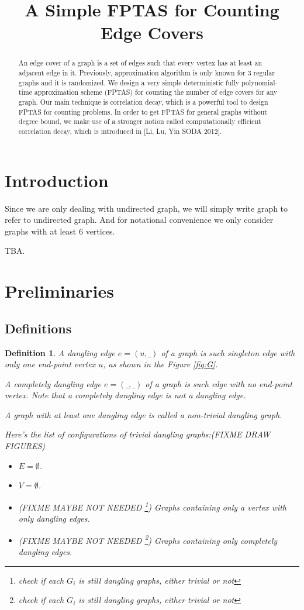 \documentclass[a4paper]{article}
\title{A Simple FPTAS for Counting Edge Covers}
\newtheorem{Def}[Thm]{Definition}
\begin{document}
\maketitle
\begin{abstract}
An edge cover of a graph is a set of edges such that every vertex has at least an adjacent edge in it. Previously, approximation algorithm is only known for 3 regular graphs and it is randomized. We design a very simple deterministic fully polynomial-time approximation scheme  (FPTAS) for counting the number of edge covers for any graph. Our main technique is correlation decay, which is a powerful tool to design FPTAS for counting problems. In order to get FPTAS for general graphs without degree bound, we make use of a stronger notion called computationally efficient correlation decay, which is introduced in [Li, Lu, Yin SODA 2012].  
\end{abstract}
\section{Introduction}
Since we are only dealing with undirected graph, we will simply write graph to refer to undirected graph.
And for notational convenience we only consider graphs with at least $6$ vertices.

TBA.
\section{Preliminaries}
\subsection{Definitions}
\begin{Def}
	A dangling edge $e=(u,\_)$ of a graph is such singleton edge with only one end-point vertex $u$, as shown in the Figure \ref{fig:G}.

	A completely dangling edge $e=(\_, \_)$ of a graph is such edge with no end-point vertex. Note that a completely dangling edge is not a dangling edge.

	A graph with at least one dangling edge is called a non-trivial dangling graph.
	
	Here's the list of configurations of trivial dangling graphs:(FIXME DRAW FIGURES) 
	\begin{itemize}
		\item  $E=\emptyset$.
		\item $V=\emptyset$.
		\item (FIXME MAYBE NOT NEEDED \footnote{check if each $G_i$ is still dangling graphs, either trivial or not}) Graphs containing only a vertex with only dangling edges.
		\item (FIXME MAYBE NOT NEEDED \footnote{check if each $G_i$ is still dangling graphs, either trivial or not}) Graphs containing only completely dangling edges.
	\end{itemize}
\end{Def}
\end{document}
